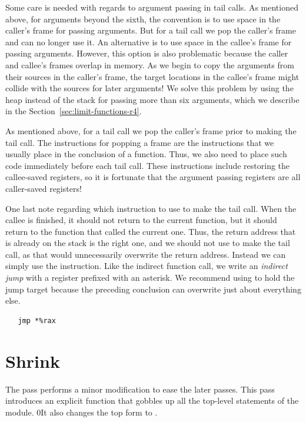 \documentclass[7x10,nocrop]{TimesAPriori_MIT}%
\def\racketEd{0}
\def\edition{0}
\newcommand{\racket}[1]{{\if\edition\racketEd{#1}\fi}}
\begin{document}
Some care is needed with regards to argument passing in tail calls.
As mentioned above, for arguments beyond the sixth, the convention is
to use space in the caller's frame for passing arguments.  But for a
tail call we pop the caller's frame and can no longer use it.  An
alternative is to use space in the callee's frame for passing
arguments. However, this option is also problematic because the caller
and callee's frames overlap in memory.  As we begin to copy the
arguments from their sources in the caller's frame, the target
locations in the callee's frame might collide with the sources for
later arguments! We solve this problem by using the heap instead of
the stack for passing more than six arguments, which we describe in
the Section~\ref{sec:limit-functions-r4}.

As mentioned above, for a tail call we pop the caller's frame prior to
making the tail call. The instructions for popping a frame are the
instructions that we usually place in the conclusion of a
function. Thus, we also need to place such code immediately before
each tail call. These instructions include restoring the callee-saved
registers, so it is fortunate that the argument passing registers are
all caller-saved registers!

One last note regarding which instruction to use to make the tail
call. When the callee is finished, it should not return to the current
function, but it should return to the function that called the current
one. Thus, the return address that is already on the stack is the
right one, and we should not use  to make the tail call, as
that would unnecessarily overwrite the return address. Instead we can
simply use the  instruction. Like the indirect function call,
we write an \emph{indirect jump} with a
register prefixed with an asterisk.  We recommend using  to
hold the jump target because the preceding conclusion can overwrite
just about everything else.
\begin{lstlisting}
   jmp *%rax
\end{lstlisting}


\section{Shrink \LangFun{}}
\label{sec:shrink-r4}

The  pass performs a minor modification to ease the
later passes. This pass introduces an explicit  function
that gobbles up all the top-level statements of the module.
%
\racket{It also changes the top  form to
\code{ProgramDefs}.}
\end{document}
